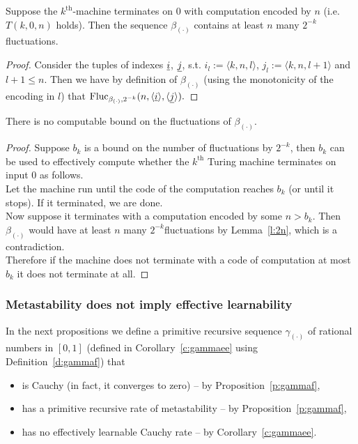 \begin{lemma}\label{l:2n}
Suppose the $k^\text{th}$-machine terminates on $0$ with computation encoded by $n$ (i.e. $T(k,0,n)$ holds). Then the sequence $\beta_{(\cdot)}$ contains at 
least $n$ many $2^{-k}$\nbd fluctuations.
\end{lemma}
\begin{proof}
Consider the tuples of indexes $\underline i$, $\underline j$, 
s.t. $i_l:=\langle k,n,l\rangle$, $j_l:=\langle k,n,l+1\rangle$ and $l+1\leq n$. Then we have by definition of $\beta_{(\cdot)}$ (using the monotonicity of the encoding in $l$) that
$
\operatorname{Fluc}_{\beta_{(\cdot)},2^{-k}}(n,\langle \underline i \rangle, \langle \underline j\rangle).
$
\end{proof}

\begin{prop}\label{p:alphaHasNoFlucBd}
There is no computable bound on the fluctuations of $\beta_{(\cdot)}$.
\end{prop}
\begin{proof}
Suppose $b_k$ is a bound on the number of fluctuations by $2^{-k}$, 
then $b_k$ can be used to effectively compute whether the $k^{\text{th}}$ Turing machine terminates on input $0$ as follows.\\
Let the machine run until the code of the computation reaches $b_k$ (or until it stops). If it terminated, we are done.\\
Now suppose it terminates with a computation encoded by some $n>b_k$. Then $\beta_{(\cdot)}$ would have at least $n$ many $2^{-k}$\nbd fluctuations by Lemma~\ref{l:2n}, which is a contradiction.\\
Therefore if the machine does not terminate with a code of computation at most $b_k$ it does not terminate at all.
\end{proof}



\subsubsection*{Metastability does not imply effective learnability}

In the next propositions we define a primitive recursive sequence 
$\gamma_{(\cdot)}$ of rational numbers in $[0,1]$ 
(defined in Corollary~\ref{c:gammaee} using Definition~\ref{d:gammaf}) that
\begin{itemize}
\item is Cauchy (in fact, it converges to zero) -- by 
Proposition~\ref{p:gammaf},
\item has a primitive recursive rate of metastability -- by Proposition~\ref{p:gammaf},
\item has no effectively learnable Cauchy rate -- by Corollary~\ref{c:gammaee}.
\end{itemize}

